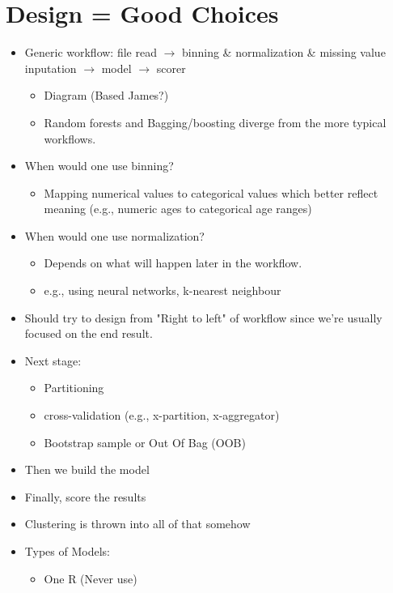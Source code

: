 \documentclass[]{memoir}
\begin{document}
  \section*{Design = Good Choices}
  \begin{itemize}
    \item Generic workflow: file read \(\rightarrow\) binning \& normalization \& missing value inputation \(\rightarrow\) model \(\rightarrow\) scorer \begin{itemize}
            \item Diagram (Based James?)
            \item Random forests and Bagging/boosting diverge from the more typical workflows.
          \end{itemize}
    \item When would one use binning? \begin{itemize}
            \item Mapping numerical values to categorical values which better reflect meaning (e.g., numeric ages to categorical age ranges)
          \end{itemize}
    \item When would one use normalization? \begin{itemize}
            \item Depends on what will happen later in the workflow.
            \item e.g., using neural networks, k-nearest neighbour
          \end{itemize}
    \item Should try to design from "Right to left" of workflow since we're usually focused on the end result.
    \item Next stage: \begin{itemize}
            \item Partitioning
            \item cross-validation (e.g., x-partition, x-aggregator)
            \item Bootstrap sample or Out Of Bag (OOB)
          \end{itemize}
    \item Then we build the model
    \item Finally, score the results
    \item Clustering is thrown into all of that somehow
    \item Types of Models: \begin{itemize}
            \item One R (Never use)

\end{itemize}
\end{itemize}
\end{document}
